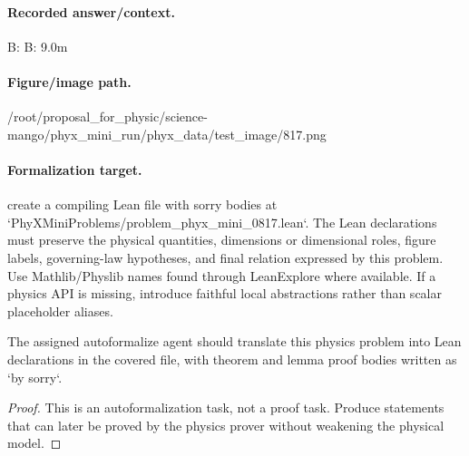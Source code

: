 \paragraph{Recorded answer/context.}
B: B: 9.0m

\paragraph{Figure/image path.}
/root/proposal\_for\_physic/science-mango/phyx\_mini\_run/phyx\_data/test\_image/817.png

\paragraph{Formalization target.}
create a compiling Lean file with sorry bodies at `PhyXMiniProblems/problem\_phyx\_mini\_0817.lean`. The Lean declarations must preserve the physical quantities, dimensions or dimensional roles, figure labels, governing-law hypotheses, and final relation expressed by this problem.
Use Mathlib/Physlib names found through LeanExplore where available. If a physics API is missing, introduce faithful local abstractions rather than scalar placeholder aliases.

\begin{theorem}
\label{thm:physics:phyx_mini_0817:target}
The assigned autoformalize agent should translate this physics problem into Lean declarations in the covered file, with theorem and lemma proof bodies written as `by sorry`.
\end{theorem}
\begin{proof}
This is an autoformalization task, not a proof task. Produce statements that can later be proved by the physics prover without weakening the physical model.
\end{proof}


